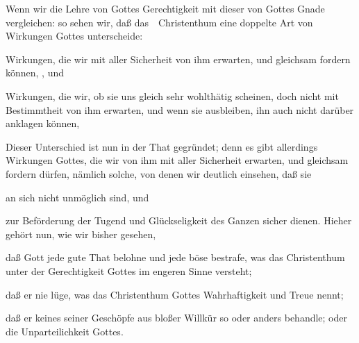 \begin{aufza}
\item Wenn wir die Lehre von Gottes Gerechtigkeit mit dieser von Gottes Gnade vergleichen: so sehen wir, daß das~\ Christenthum eine doppelte Art von Wirkungen Gottes unterscheide:
\begin{aufzb}
\item Wirkungen, die wir mit aller Sicherheit von ihm erwarten, und gleichsam fordern können, , und
\item Wirkungen, die wir, ob sie uns gleich sehr wohlthätig scheinen, doch nicht mit Bestimmtheit von ihm erwarten, und wenn sie ausbleiben, ihn auch nicht darüber anklagen können,
\end{aufzb}
\item Dieser Unterschied ist nun in der That gegründet; denn es gibt allerdings Wirkungen Gottes, die wir von ihm mit aller Sicherheit erwarten, und gleichsam fordern dürfen, nämlich solche, von denen wir deutlich einsehen, daß sie
\begin{aufzb}
\item an sich nicht unmöglich sind, und
\item zur Beförderung der Tugend und Glückseligkeit des Ganzen sicher dienen. Hieher gehört nun, wie wir bisher gesehen, 
\begin{aufzc}
\item daß Gott jede gute That belohne und jede böse bestrafe, was das Christenthum unter der Gerechtigkeit Gottes im engeren Sinne versteht;
\item daß er nie lüge, was das Christenthum Gottes Wahrhaftigkeit und Treue nennt;
\item daß er keines seiner Geschöpfe aus bloßer Willkür so oder anders behandle; oder die Unparteilichkeit Gottes.
\end{aufzc}
\end{aufzb}

\end{aufza}
